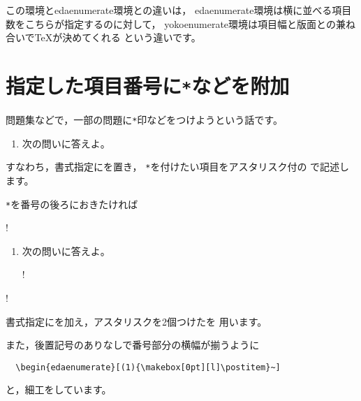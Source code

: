 \documentclass[a4j]{jarticle}
\begin{document}
この環境と\textsf{edaenumerate}環境との違いは，
\textsf{edaenumerate}環境は横に並べる項目数をこちらが指定するのに対して，
\textsf{yokoenumerate}環境は項目幅と版面との兼ね合いで\TeX が決めてくれる
という違いです。

\section{指定した項目番号に\texttt{*}などを附加}
問題集などで，一部の問題に\texttt{*}印などをつけようという話です。

\begin{showEx}{}
\begin{enumerate}[1.~]
  \item 次の問いに答えよ。
\end{enumerate}
\end{showEx}

すなわち，書式指定にを置き，
\texttt{*}を付けたい項目をアスタリスク付の 
で記述します。

\texttt{*}を番号の後ろにおきたければ

\begin{showpEx}{}
!\begin{enumerate}[1.~]
! \item 次の問いに答えよ。
!\end{enumerate}
!\end{showpEx}
書式指定にを加え，アスタリスクを2個つけたを
用います。

また，後置記号のありなしで番号部分の横幅が揃うように
\begin{jquote}
\begin{verbatim}
  \begin{edaenumerate}[(1){\makebox[0pt][l]\postitem}~]
\end{verbatim}
\end{jquote}
と，細工をしています。
\end{document}
